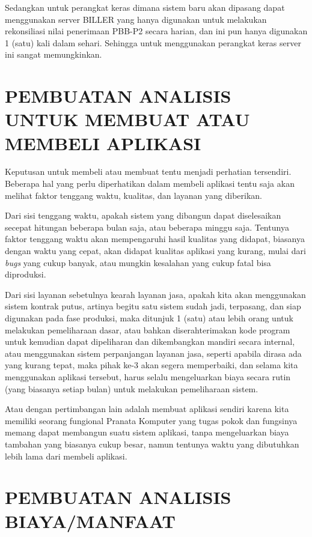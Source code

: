 \documentclass[pdftex,12pt, oneside]{article}
\begin{document}
Sedangkan untuk perangkat keras dimana sistem baru akan dipasang dapat menggunakan server BILLER yang hanya digunakan untuk melakukan rekonsiliasi nilai penerimaan PBB-P2 secara harian, dan ini pun hanya digunakan 1 (satu) kali dalam sehari. Sehingga untuk menggunakan perangkat keras server ini sangat memungkinkan.

\section{PEMBUATAN ANALISIS UNTUK MEMBUAT ATAU MEMBELI APLIKASI}

Keputusan untuk membeli atau membuat tentu menjadi perhatian tersendiri. Beberapa hal yang perlu diperhatikan dalam membeli aplikasi tentu saja akan melihat faktor tenggang waktu, kualitas, dan layanan yang diberikan. 

Dari sisi tenggang waktu, apakah sistem yang dibangun dapat diselesaikan secepat hitungan beberapa bulan saja, atau beberapa minggu saja. Tentunya faktor tenggang waktu akan mempengaruhi hasil kualitas yang didapat, biasanya dengan waktu yang cepat, akan didapat kualitas aplikasi yang kurang, mulai dari \textit{bugs} yang cukup banyak, atau mungkin kesalahan yang cukup fatal bisa diproduksi.

Dari sisi layanan sebetulnya kearah layanan jasa, apakah kita akan menggunakan sistem kontrak putus, artinya begitu satu sistem sudah jadi, terpasang, dan siap digunakan pada fase produksi, maka ditunjuk 1 (satu) atau lebih orang untuk melakukan pemeliharaan dasar, atau bahkan diserahterimakan kode program untuk kemudian dapat dipeliharan dan dikembangkan mandiri secara internal, atau menggunakan sistem perpanjangan layanan jasa, seperti apabila dirasa ada yang kurang tepat, maka pihak ke-3 akan segera memperbaiki, dan selama kita menggunakan aplikasi tersebut, harus selalu mengeluarkan biaya secara rutin (yang biasanya setiap bulan) untuk melakukan pemeliharaan sistem.

Atau dengan pertimbangan lain adalah membuat aplikasi sendiri karena kita memiliki seorang fungional Pranata Komputer yang tugas pokok dan fungsinya memang dapat membangun suatu sistem aplikasi, tanpa mengeluarkan biaya tambahan yang biasanya cukup besar, namun tentunya waktu yang dibutuhkan lebih lama dari membeli aplikasi.

\section{PEMBUATAN ANALISIS BIAYA/MANFAAT}
\end{document}

